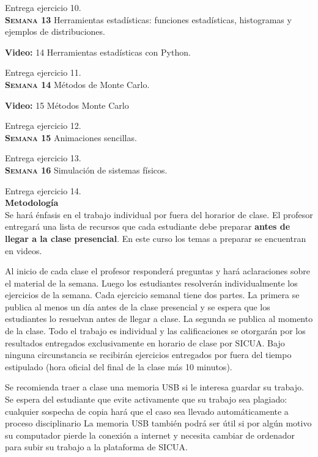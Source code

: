 \documentclass[letterpaper,10pt,onecolumn]{article}
\begin{document}
Entrega ejercicio 10.
\\[-0.3cm]  

\noindent\textbf{\textsc{Semana 13}} Herramientas
estadísticas: funciones estadísticas, histogramas y ejemplos de
distribuciones.

\textbf{Video:} 14 Herramientas estadísticas con Python.

Entrega ejercicio 11.
\\[-0.3cm] 

\noindent\textbf{\textsc{Semana 14}} Métodos de Monte Carlo.

\textbf{Video:} 15 M\'etodos Monte Carlo 

Entrega ejercicio 12.
\\[-0.3cm] 


\noindent\textbf{\textsc{Semana 15}} Animaciones sencillas. 

Entrega ejercicio 13.
\\[-0.3cm] 

\noindent\textbf{\textsc{Semana 16}} Simulaci\'on de sistemas f\'isicos. 

Entrega ejercicio 14.
\\[-0.1cm] 

\noindent\textbf{\large {} \quad Metodología}\\[-0.2cm]

\noindent\normalsize Se har\'a \'enfasis en el trabajo individual por
fuera del horarior de clase. El profesor entregar\'a una lista de
recursos que cada estudiante debe preparar {\bf antes de llegar a la
  clase presencial}.   
En este curso los temas a preparar se encuentran en videos.

Al inicio de cada clase el profesor responderá preguntas y 
hará aclaraciones sobre el material de la semana. Luego los
estudiantes resolverán individualmente los ejercicios de la semana.
Cada ejercicio semanal tiene dos partes. La primera se publica al menos un
d\'ia antes de la clase presencial y se espera que los estudiantes lo resuelvan antes de llegar a clase. La segunda se publica al
momento de la clase.
Todo el trabajo es individual y las calificaciones se otorgar\'an por
los resultados entregados exclusivamente en horario de clase por SICUA. 
Bajo ninguna circunstancia se recibirán ejercicios entregados por fuera 
del tiempo estipulado (hora oficial del final de la clase más 10 minutos).

Se recomienda traer a clase una memoria USB si le interesa guardar su 
trabajo. Se espera del estudiante que evite activamente que
su trabajo sea plagiado: cualquier sospecha de copia hará que el caso sea
llevado automáticamente a proceso disciplinario
La memoria USB también podrá ser útil si por algún motivo su computador
pierde la conexión a internet y necesita cambiar de ordenador para subir
su trabajo a la plataforma de SICUA.
\\[0.1cm] 
\end{document}
